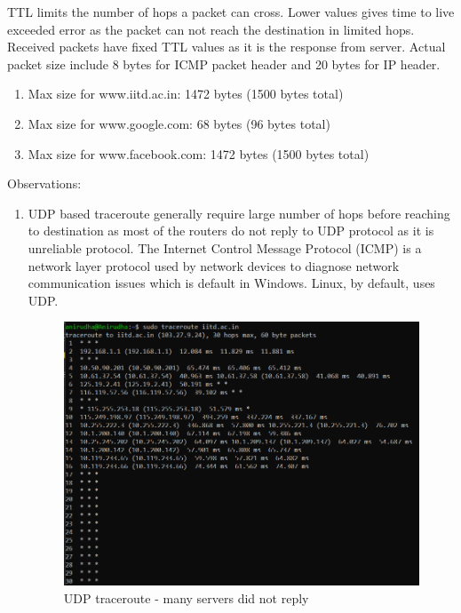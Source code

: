 \documentclass[]{assignment}
\begin{document}
\begin{alphaparts}
        \questionpart TTL limits the number of hops a packet can cross. Lower values gives time to live exceeded error as the packet can not reach the destination in limited hops. Received packets have fixed TTL values as it is the response from server. Actual packet size include 8 bytes for ICMP packet header and 20 bytes for IP header. 
            \begin{enumerate} 
                \item Max size for www.iitd.ac.in: 1472 bytes (1500 bytes total)
                \item Max size for www.google.com: 68 bytes (96 bytes total)
                \item Max size for www.facebook.com: 1472 bytes (1500 bytes total)
            \end{enumerate}
        \questionpart
        Observations: 
            \begin{enumerate} 
                \item UDP based traceroute generally require large number of hops before reaching to destination as most of the routers do not reply to UDP protocol as it is unreliable protocol. The Internet Control Message Protocol (ICMP) is a network layer protocol used by network devices to diagnose network communication issues which is default in Windows. Linux, by default, uses UDP.     
                \begin{figure}[hbt!]
                \centering
                \includegraphics[width=16cm]{assignment-1/report/udpping.png}
                \caption{UDP traceroute - many servers did not reply}
                \label{fig:galaxy}
                \end{figure}
                

\end{enumerate}
\end{alphaparts}
\end{document}
